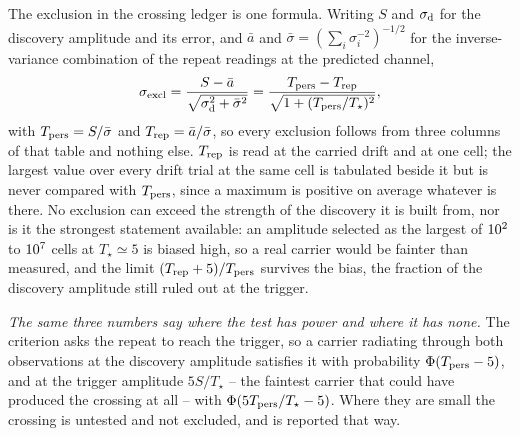 The exclusion in the crossing ledger is one formula. Writing $S$ and
$\sigma_{\rm d}$ for the discovery amplitude and its error, and $\bar{a}$ and
$\bar{\sigma}=(\sum_i\sigma_i^{-2})^{-1/2}$ for the inverse-variance
combination of the repeat readings at the predicted channel,
\begin{equation}
\sigma_{\rm excl}=\frac{S-\bar{a}}
{\sqrt{\sigma_{\rm d}^{2}+\bar{\sigma}^{2}}}
=\frac{T_{\rm pers}-T_{\rm rep}}{\sqrt{1+(T_{\rm pers}/T_\star)^{2}}},
\label{eq:excl}
\end{equation}
with $T_{\rm pers}=S/\bar{\sigma}$ and $T_{\rm rep}=\bar{a}/\bar{\sigma}$, so
every exclusion follows from three columns of that table and nothing else.
$T_{\rm rep}$ is read at the carried drift and at one cell; the largest value
over every drift trial at the same cell is tabulated beside it but is never
compared with $T_{\rm pers}$, since a maximum is positive on average whatever
is there. No exclusion can exceed the strength of the discovery it is built
from, nor is it the strongest statement available: an amplitude selected as
the largest of $10^{2}$ to $10^{7}$ cells at $T_\star\simeq5$ is biased high,
so a real carrier would be fainter than measured, and the
limit $(T_{\rm rep}+5)/T_{\rm pers}$ survives the bias, the
fraction of the discovery amplitude still ruled out at the trigger.

\emph{The same three numbers say where the test has power and where it has
none.} The criterion asks the repeat to reach the trigger, so a carrier
radiating through both observations at the discovery amplitude satisfies it
with probability $\Phi(T_{\rm pers}-5)$, and at the trigger amplitude
$5S/T_\star$ -- the faintest carrier that could have produced the crossing
at all -- with $\Phi(5T_{\rm pers}/T_\star-5)$. Where they are small the
crossing is untested and not excluded, and is reported that way.

